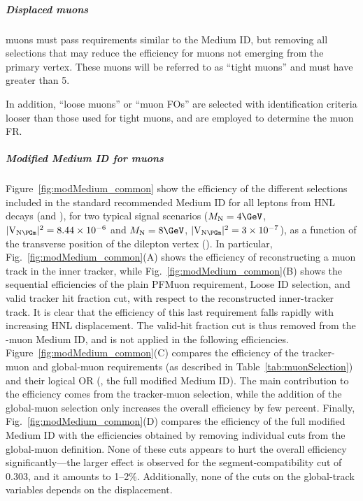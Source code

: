 \subparagraph {Displaced muons}
\Displ muons must pass requirements similar to the Medium ID, but
removing all selections that may reduce the efficiency for muons not
emerging from the primary vertex.
These \displ muons will be referred to as ``tight \displ muons''
and must have \pt greater than 5\GeV.

In addition, ``loose \displ muons'' or ``muon FOs'' are selected
with identification criteria looser than those used for tight
\displ muons, and are employed to determine the muon FR.
\subparagraph{Modified Medium ID for \displ muons}\label{sec:modifiedMedium}

Figure~\ref{fig:modMedium_common}
show the efficiency of the different selections included in the
standard recommended Medium ID for all \displ leptons from HNL
decays (\ltwo and \lthree), for two typical signal scenarios
($\mhnl=4\GeV$, $\mixparm=8.44\times10^{-6}$ and
$\mhnl=8\GeV$, $\mixparm=3\times10^{-7}$),
as a function of the transverse position of the dilepton vertex
(\Deltwod).
In particular, Fig.~\ref{fig:modMedium_common}(A) shows the efficiency of
reconstructing a muon track in the inner tracker, while 
Fig.~\ref{fig:modMedium_common}(B) shows the sequential
efficiencies of the plain PFMuon requirement, Loose ID selection, and
valid tracker hit fraction cut, with respect to the reconstructed
inner-tracker track. It is clear that the efficiency of
this last requirement falls rapidly with increasing HNL
displacement. The valid-hit fraction cut is thus removed from the
\displ-muon Medium ID, and is not applied in the following
efficiencies.
Figure~\ref{fig:modMedium_common}(C) compares the efficiency of the
tracker-muon and global-muon requirements (as described in
Table~\ref{tab:muonSelection}) and their logical OR (\ie, the full
modified Medium ID). The main contribution to the efficiency comes
from the tracker-muon selection, while the addition of the global-muon
selection only increases the overall efficiency by few percent.
Finally, Fig.~\ref{fig:modMedium_common}(D) compares the efficiency of
the full modified Medium ID with the efficiencies obtained by removing
individual cuts from the global-muon definition. None of these cuts
appears to hurt the overall efficiency significantly---the larger
effect is observed for the segment-compatibility cut of 0.303, and it
amounts to 1--2\%. Additionally, none of the cuts on the global-track
variables depends on the displacement.
